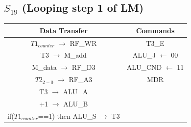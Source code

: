 \documentclass[]{report}
\begin{document}
            \subsection*{$S_{19}$ (Looping step 1 of LM)} %
            \begin{center}
                \begin{tabular}{|c|c|}
                    \hline
                    Data Transfer & Commands \\
                    \hline
                    $T1_{counter}$ $\to$ RF\_WR & T3\_E\\
                    T3 $\to$ M\_add & ALU\_J $\leftarrow$ 00\\
                    M\_data $\to$ RF\_D3 & ALU\_CND $\leftarrow$ 11\\
                    $T2_{2-0}$ $\to$ RF\_A3 & MDR\\
                    T3 $\to$ ALU\_A & \\
                    +1 $\to$ ALU\_B & \\
                    if($T1_{counter}$==1) then ALU\_S $\to$ T3& \\
                    \hline
                \end{tabular}
            \end{center} 
\end{document}
